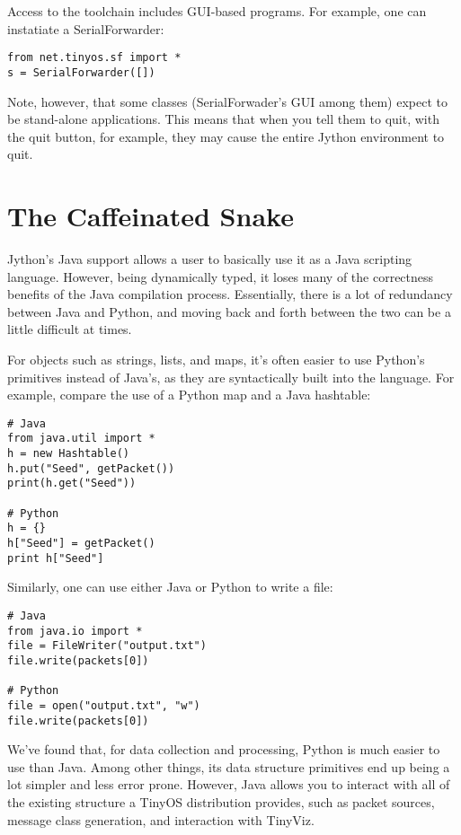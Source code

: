 \documentclass[10pt]{article}
\begin{document}
Access to the toolchain includes GUI-based programs. For example, one
can instatiate a SerialForwarder:

\begin{verbatim}
from net.tinyos.sf import *
s = SerialForwarder([])
\end{verbatim}

Note, however, that some classes (SerialForwader's GUI among them)
expect to be stand-alone applications. This means that when you tell
them to quit, with the quit button, for example, they may cause the
entire Jython environment to quit.

\section{The Caffeinated Snake}

Jython's Java support allows a user to basically use it as a 
Java scripting language. However, being dynamically typed, it loses
many of the correctness benefits of the Java compilation process. 
Essentially, there is a lot of redundancy between Java and Python,
and moving back and forth between the two can be a little difficult at times.

For objects such as strings, lists, and maps, it's often easier to use
Python's primitives instead of Java's, as they are syntactically built
into the language. For example, compare the use of a Python map and a
Java hashtable:

\begin{verbatim}
# Java
from java.util import *
h = new Hashtable()
h.put("Seed", getPacket())
print(h.get("Seed"))

# Python
h = {}
h["Seed"] = getPacket()
print h["Seed"]
\end{verbatim}

Similarly, one can use either Java or Python to write a file:


\begin{verbatim}
# Java
from java.io import *
file = FileWriter("output.txt")
file.write(packets[0])

# Python
file = open("output.txt", "w")
file.write(packets[0])
\end{verbatim}

We've found that, for data collection and processing, Python is much
easier to use than Java. Among other things, its data structure
primitives end up being a lot simpler and less error prone. However,
Java allows you to interact with all of the existing structure a
TinyOS distribution provides, such as packet sources, message class
generation, and interaction with TinyViz.
\end{document}
